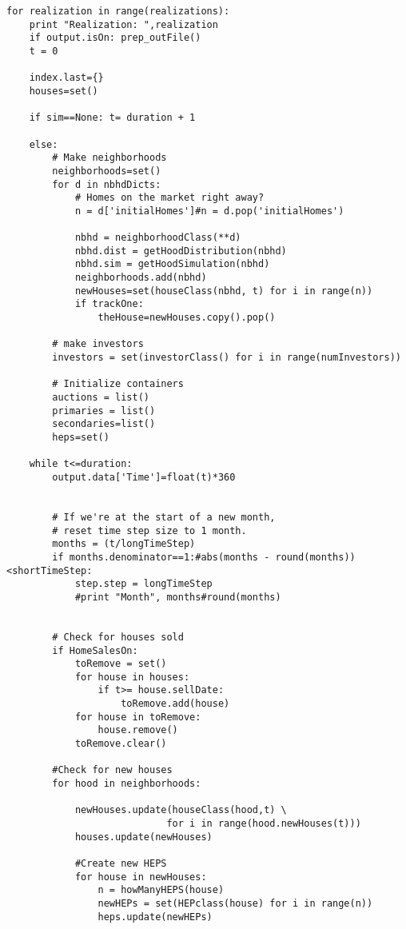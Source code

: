 \begin{lstlisting}
for realization in range(realizations):
    print "Realization: ",realization
    if output.isOn: prep_outFile()
    t = 0

    index.last={}
    houses=set()

    if sim==None: t= duration + 1
    
    else:
        # Make neighborhoods
        neighborhoods=set()
        for d in nbhdDicts:
            # Homes on the market right away?
            n = d['initialHomes']#n = d.pop('initialHomes')

            nbhd = neighborhoodClass(**d)
            nbhd.dist = getHoodDistribution(nbhd)
            nbhd.sim = getHoodSimulation(nbhd)
            neighborhoods.add(nbhd)
            newHouses=set(houseClass(nbhd, t) for i in range(n))
            if trackOne:
                theHouse=newHouses.copy().pop()
                    
        # make investors
        investors = set(investorClass() for i in range(numInvestors))

        # Initialize containers
        auctions = list()
        primaries = list()
        secondaries=list()
        heps=set()
    
    while t<=duration:
        output.data['Time']=float(t)*360

        
        # If we're at the start of a new month,
        # reset time step size to 1 month.
        months = (t/longTimeStep)
        if months.denominator==1:#abs(months - round(months))<shortTimeStep:
            step.step = longTimeStep
            #print "Month", months#round(months)

        
        # Check for houses sold
        if HomeSalesOn:
            toRemove = set()
            for house in houses:
                if t>= house.sellDate:
                    toRemove.add(house)
            for house in toRemove:
                house.remove()
            toRemove.clear()

        #Check for new houses
        for hood in neighborhoods:
            
            newHouses.update(houseClass(hood,t) \
                            for i in range(hood.newHouses(t)))
            houses.update(newHouses)
            
            #Create new HEPS
            for house in newHouses:
                n = howManyHEPS(house)
                newHEPs = set(HEPclass(house) for i in range(n))
                heps.update(newHEPs)


\end{lstlisting}
